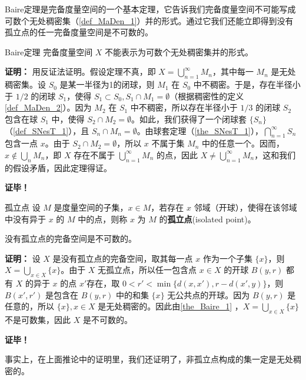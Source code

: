 
Baire定理是完备度量空间的一个基本定理，它告诉我们完备度量空间不可能写成可数个无处稠密集（\autoref{def_MaDen_1}）并的形式。通过它我们还能立即得到没有孤立点的任一完备度量空间是不可数的。

\begin{theorem}{Baire定理}\label{the_Baire_1}
完备度量空间 $X$ 不能表示为可数个无处稠密集并的形式。
\end{theorem}
\textbf{证明：}
用反证法证明。假设定理不真，即 $X=\bigcup_{n=1}^\infty M_n$，其中每一 $M_n$ 是无处稠密集。设 $S_0$ 是某一半径为1的闭球，则 $M_1$ 在 $S_0$ 中不稠密。于是，存在半径小于 $1/2$ 的闭球 $S_1$，使得 $S_1\subset S_0,S_1\cap M_1=\emptyset$（根据稠密性的定义\autoref{def_MaDen_2}）。因为 $M_2$ 在 $S_1$ 中不稠密，所以存在半径小于 $1/3$ 的闭球 $S_2$ 包含在球 $S_1$ 中，使得 $S_2\cap M_2=\emptyset$。如此，我们获得了一个闭球套 $\{S_n\}$ （\autoref{def_SNesT_1}），且 $S_n\cap M_n=\emptyset$。由球套定理（\autoref{the_SNesT_1}），$\bigcap_{n=1}^\infty S_n$ 包含一点 $x$。由于 $S_2\cap M_2=\emptyset$，所以 $x$ 不属于集 $M_n$ 中的任意一个。因而，$x\notin \bigcup\limits_n M_n$，即 $X$ 存在不属于 $\bigcup_{n=1}^\infty M_n$ 的点，因此 $X\neq\bigcup_{n=1}^\infty M_n$，这和我们的假设矛盾，因此定理得证。

\textbf{证毕！}


\begin{definition}{孤立点}
设 $M$ 是度量空间的子集，$x\in M$，若存在 $x$ 邻域（开球），使得在该邻域中没有异于 $x$ 的 $M$ 中的点，则称 $x$ 为 $M$ 的\textbf{孤立点}(isolated point)。
\end{definition}

\begin{corollary}{}
没有孤立点的完备空间是不可数的。
\end{corollary}

\textbf{证明：}
设 $X$ 是没有孤立点的完备空间，取其每一点 $x$ 作为一个子集 $\{x\}$，则 $X=\bigcup\limits_{x\in X}\{x\}$。由于 $X$ 无孤立点，所以任一包含点 $x\in X$ 的开球 $B(y,r)$ 都有 $X$ 的异于 $x$ 的点 $x'$存在，取 $0<r'<\min\{d(x,x'),r-d(x',y)\}$，则 $B(x',r')$ 是包含在 $B(y,r)$ 中的和集 $\{x\}$ 无公共点的开球。因为 $B(y,r)$ 是任意的，所以 $\{x\},x\in X$ 是无处稠密的。因此由\autoref{the_Baire_1} ，$X=\bigcup\limits_{x\in X}\{x\}$ 不是可数集，因此 $X$ 是不可数的。

\textbf{证毕！}

事实上，在上面推论中的证明里，我们还证明了，非孤立点构成的集一定是无处稠密的。


